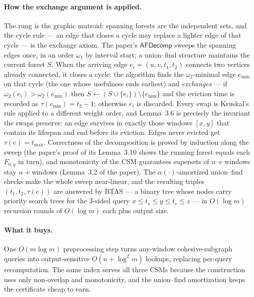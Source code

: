 \paragraph{How the exchange argument is applied.}
The rung is the graphic matroid: spanning forests are the independent sets, and the
cycle rule --- an edge that closes a cycle may replace a lighter edge of that cycle ---
is the exchange axiom. The paper's $\mathsf{AFDecomp}$ sweeps the spanning edges once,
in an order $\omega_1$ by interval start; a union--find structure maintains the
current forest $S$. When the arriving edge $e_i=(u,v,t_1,t_2)$ connects two vertices
already connected, it closes a cycle: the algorithm finds the $\omega_2$-minimal edge
$e_{\min}$ on that cycle (the one whose usefulness ends earliest) and \emph{exchanges}
--- if $\omega_2(e_i)>\omega_2(e_{\min})$ then $S \gets (S\cup\{e_i\})\setminus\{e_{\min}\}$
and the eviction time is recorded as $\tau(e_{\min}) = t_2-1$; otherwise $e_i$ is
discarded. Every swap is Kruskal's rule applied to a different weight order, and
Lemma~3.6 is precisely the invariant the swaps preserve: an edge survives in exactly
those windows $[x,y]$ that contain its lifespan and end before its eviction. Edges
never evicted get $\tau(e)=t_{\max}$. Correctness of the decomposition is proved by
induction along the sweep (the paper's proof of its Lemma~3.10 shows the running
forest equals each $F_{0,y}$ in turn), and monotonicity of the CSM guarantees
supersets of $u$--$v$ windows stay $u$--$v$ windows (Lemma~3.2 of the paper). The
$\alpha(\cdot)$-amortized union--find checks make the whole sweep near-linear, and the
resulting triples $(t_1,t_2,\tau(e))$ are answered by BTAS --- a binary tree whose
nodes carry priority search trees for the 3-sided query $x\le t_s\le y\le t_e\le z$ ---
in $O(\log m)$ recursion rounds of $O(\log m)$ each plus output size.


\paragraph{What it buys.}
One $O(m\log m)$ preprocessing step turns any-window cohesive-subgraph queries into
output-sensitive $O(n+\log^{2}m)$ lookups, replacing per-query recomputation. The same
index serves all three CSMs because the construction uses only non-overlap and
monotonicity, and the union--find amortization keeps the certificate cheap to earn.

